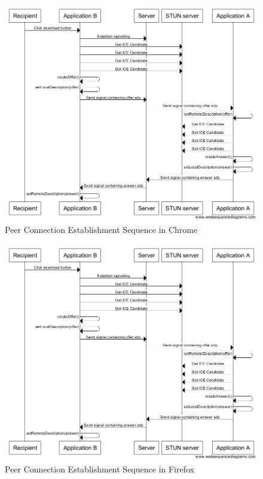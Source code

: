 \documentclass[]{report}
\begin{document}
			\begin{figure}[H]
				\caption{Peer Connection Establishment Sequence in Chrome}
				\centering
				\includegraphics[scale=0.5]{peer-connection-establishment-sequence-chrome.png}
			\end{figure}
			
			\begin{figure}[H]
				\caption{Peer Connection Establishment Sequence in Firefox}
				\centering
				\includegraphics[scale=0.5]{peer-connection-establishment-sequence-firefox.png}
			\end{figure}
			
\end{document}
